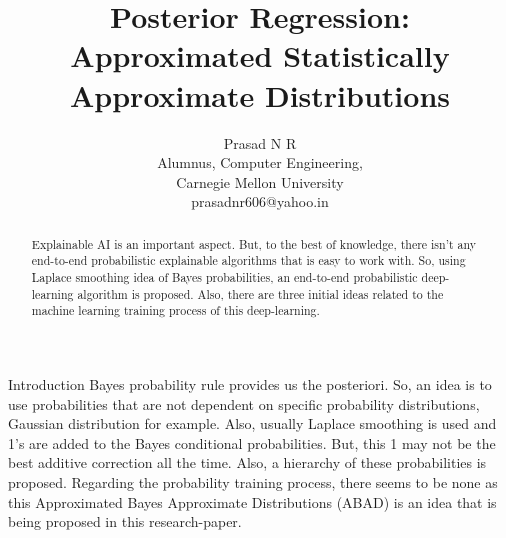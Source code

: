 \documentclass{article}
\title{Posterior Regression: Approximated Statistically Approximate Distributions}
\author{Prasad N R\\Alumnus, Computer Engineering, \\Carnegie Mellon University\\prasadnr606@yahoo.in}
\begin{document}
	\maketitle 
	\begin{abstract}
		Explainable AI is an important aspect. But, to the best of knowledge, there isn't any end-to-end probabilistic explainable algorithms that is easy to work with. So, using Laplace smoothing idea of Bayes probabilities, an end-to-end probabilistic deep-learning algorithm is proposed. Also, there are three initial ideas related to the machine learning training process of this deep-learning.
	\end{abstract}
	
	\begin{section}{Introduction}
		Bayes probability rule provides us the posteriori. So, an idea is to use probabilities that are not dependent on specific probability distributions, Gaussian distribution for example. Also, usually Laplace smoothing is used and 1's are added to the Bayes conditional probabilities. But, this 1 may not be the best additive correction all the time. Also, a hierarchy of these probabilities is proposed. Regarding the probability training process, there seems to be none as this Approximated Bayes Approximate Distributions (ABAD) is an idea that is being proposed in this research-paper. 
	\end{section}
	
\end{document}
